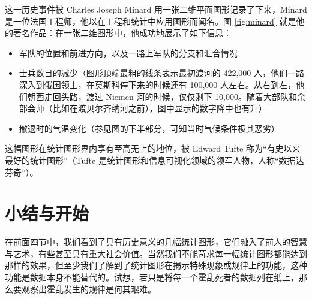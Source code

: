 \documentclass[
  b5paper,
  UTF8,twoside]{book}
\providecommand{\tightlist}{%
  \setlength{\itemsep}{0pt}\setlength{\parskip}{0pt}}
\begin{document}
这一历史事件被 Charles Joseph Minard 用一张二维平面图形记录了下来，Minard 是一位法国工程师，他以在工程和统计中应用图形而闻名。图 \ref{fig:minard} 就是他的著名作品：在一张二维图形中，他成功地展示了如下信息：

\begin{itemize}
\tightlist
\item
  军队的位置和前进方向，以及一路上军队的分支和汇合情况
\item
  士兵数目的减少（图形顶端最粗的线条表示最初渡河的 422,000 人，他们一路深入到俄国领土，在莫斯科停下来的时候还有 100,000 人左右。从右到左，他们朝西走回头路，渡过 Niemen 河的时候，仅仅剩下 10,000。随着大部队和余部会师（比如在渡贝尔齐纳河之前），图中显示的数字降中也有升）
\item
  撤退时的气温变化（参见图的下半部分，可知当时气候条件极其恶劣）
\end{itemize}

这幅图形在统计图形界内享有至高无上的地位，被 Edward Tufte 称为``有史以来最好的统计图形''（Tufte 是统计图形和信息可视化领域的领军人物，人称``数据达芬奇''）。

\section{小结与开始}\label{sec:begin}

在前面四节中，我们看到了具有历史意义的几幅统计图形，它们融入了前人的智慧与艺术，有些甚至具有重大社会价值。当然我们不能苛求每一幅统计图形都能达到那样的效果，但至少我们了解到了统计图形在揭示特殊现象或规律上的功能，这种功能是数据本身不能替代的。试想，若只是将每一个霍乱死者的数据列在纸上，那么要观察出霍乱发生的规律是何其艰难。
\end{document}
